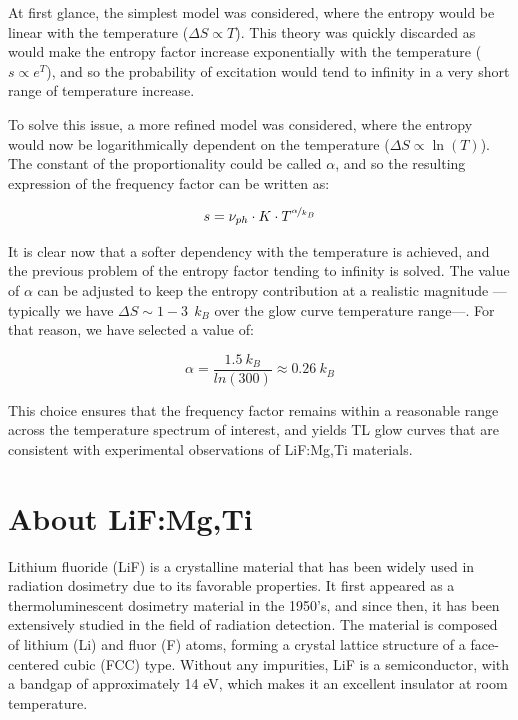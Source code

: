\vspace{10pt}

At first glance, the simplest model was considered, where the entropy would be linear with the temperature ($\Delta S \propto T$). This theory was quickly discarded as would make the entropy factor increase exponentially with the temperature ($s \propto e^T$), and so the probability of excitation would tend to infinity in a very short range of temperature increase.

\vspace{10pt}

To solve this issue, a more refined model was considered, where the entropy would now be logarithmically dependent on the temperature ($\Delta S \propto \ln(T)$). The constant of the proportionality could be called $\alpha$, and so the resulting expression of the frequency factor can be written as:

\begin{equation}\label{eq:freqfactor_lnT}
    s = \nu_{ph} \cdot K \cdot T^{\nicefrac{\alpha}{k_B}}
\end{equation}

\vspace{10pt}

It is clear now that a softer dependency with the temperature is achieved, and the previous problem of the entropy factor tending to infinity is solved. The value of $\alpha$ can be adjusted to keep the entropy contribution at a realistic magnitude ---typically we have $\Delta S \sim  1\!-\!3 ~~k_B$ over the glow curve temperature range---. For that reason, we have selected a value of:

\begin{equation}
    \alpha = \frac{1.5 ~k_B}{ln(300)} \approx 0.26 ~k_B
\end{equation}

\vspace{10pt}

This choice ensures that the frequency factor remains within a reasonable range across the temperature spectrum of interest, and yields TL glow curves that are consistent with experimental observations of LiF:Mg,Ti materials.


\section{About LiF:Mg,Ti} \label{sec:LiF}


Lithium fluoride (LiF) is a crystalline material that has been widely used in radiation dosimetry due to its favorable %
properties. It first appeared as a thermoluminescent dosimetry material in the 1950's, and since then, it has been extensively studied in the field of radiation detection. The material is composed of lithium (Li) and fluor (F) %
atoms, forming a crystal lattice structure of a face-centered cubic (FCC) type. Without any impurities, LiF is a semiconductor, with a bandgap of approximately 14 eV, which makes it an excellent insulator at room temperature.

